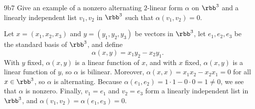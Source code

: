 \begin{exercise}{9b7}
    Give an example of a nonzero alternating $2$-linear form $\alpha$ on $\rbb^3$ and a linearly independent list $v_1, v_2$ in $\rbb^3$ such that $\alpha(v_1, v_2) = 0$.

\end{exercise}

\begin{sol}
    Let $x = (x_1, x_2, x_3)$ and $y = (y_1, y_2, y_3)$ be vectors in $\rbb^3$, let $e_1, e_2, e_3$ be the standard basis of $\rbb^3$, and define
    \[
        \alpha(x, y) = x_1 y_2 - x_2 y_1.
    \]
    With $y$ fixed, $\alpha(x, y)$ is a linear function of $x$, and with $x$ fixed, $\alpha(x, y)$ is a linear function of $y$, so $\alpha$ is bilinear.
    Moreover, $\alpha(x, x) = x_1x_2 - x_2x_1 = 0$ for all $x \in \rbb^3$, so $\alpha$ is alternating.
    Because $\alpha(e_1, e_2) = 1\cdot 1 - 0\cdot 0 = 1 \neq 0$, we see that $\alpha$ is nonzero.
    Finally, $v_1 = e_1$ and $v_2 = e_3$ form a linearly independent list in $\rbb^3$, and $\alpha(v_1, v_2) = \alpha(e_1, e_3) = 0$.
\end{sol}